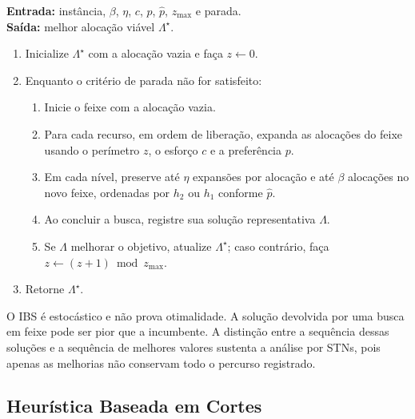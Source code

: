 \begin{quadro}[htbp]
\centering
\caption{Pseudocódigo do IBS com buscas em feixe sucessivas.}
\label{qua:pseudo-ibs}
\begin{minipage}{0.95\textwidth}
\begin{singlespace}
\textbf{Entrada:} instância, $\beta$, $\eta$, $c$, $p$, $\hat p$, $z_{\max}$ e parada.\\
\textbf{Saída:} melhor alocação viável $\Lambda^\star$.
\begin{enumerate}
 \item Inicialize $\Lambda^\star$ com a alocação vazia e faça $z\leftarrow0$.
 \item Enquanto o critério de parada não for satisfeito:
 \begin{enumerate}
  \item Inicie o feixe com a alocação vazia.
  \item Para cada recurso, em ordem de liberação, expanda as alocações do feixe usando o perímetro $z$, o esforço $c$ e a preferência $p$.
  \item Em cada nível, preserve até $\eta$ expansões por alocação e até $\beta$ alocações no novo feixe, ordenadas por $h_2$ ou $h_1$ conforme $\hat p$.
  \item Ao concluir a busca, registre sua solução representativa $\Lambda$.
  \item Se $\Lambda$ melhorar o objetivo, atualize $\Lambda^\star$; caso contrário, faça $z\leftarrow(z+1)\bmod z_{\max}$.
 \end{enumerate}
 \item Retorne $\Lambda^\star$.
\end{enumerate}
{}
\end{singlespace}
\end{minipage}
\end{quadro}

O IBS é estocástico e não prova otimalidade. A solução devolvida por uma
busca em feixe pode ser pior que a incumbente. A distinção entre a sequência
dessas soluções e a sequência de melhores valores sustenta a análise
por STNs, pois apenas as melhorias não conservam todo o percurso registrado.

\subsection{Heurística Baseada em Cortes}\label{sec:cuth}

